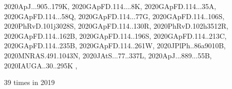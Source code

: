 \documentclass[12pt]{article}
\begin{document}
\begin{description}
{2020ApJ...905..179K,%
2020GApFD.114....8K,%
2020GApFD.114...35A,%
2020GApFD.114...58Q,%
2020GApFD.114...77G,%
2020GApFD.114..106S,%
2020PhRvD.101j3028S,%
2020GApFD.114..130R,%
2020PhRvD.102h3512R,%
2020GApFD.114..162B,%
2020GApFD.114..196S,%
2020GApFD.114..213C,%
2020GApFD.114..235B,%
2020GApFD.114..261W,%
2020JPlPh..86a9010B,%
2020MNRAS.491.1043N,%
2020JAtS...77..337L,%
2020ApJ...889...55B,%
2020IAUGA..30..295K%
},\item
\item %
39 times in 2019 \citep{
Peng2019HelicityHT,%
2019arXiv190808781E,%
2019arXiv191101039P,%
2019ApJ...872..132P,%
2019arXiv190204172R,%
}
\end{description}
\end{document}
